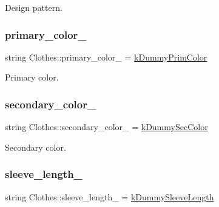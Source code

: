 Design pattern. 

\mbox{\label{classClothes_a7cb005bf6cbb7f4eaa40f1b31817559c}} 
\subsubsection{\texorpdfstring{primary\+\_\+color\+\_\+}{primary\_color\_}}
{\footnotesize\ttfamily string Clothes\+::primary\+\_\+color\+\_\+ = \mbox{\hyperlink{clothes_8h_a1b9c685d3bf2811d95b65e0d396c1344}{k\+Dummy\+Prim\+Color}}\hspace{0.3cm}{\ttfamily [protected]}}



Primary color. 

\mbox{\label{classClothes_ab8f55f67b956b25d71260cffcf273673}} 
\subsubsection{\texorpdfstring{secondary\+\_\+color\+\_\+}{secondary\_color\_}}
{\footnotesize\ttfamily string Clothes\+::secondary\+\_\+color\+\_\+ = \mbox{\hyperlink{clothes_8h_a71c39811135425d881af7760da63a73a}{k\+Dummy\+Sec\+Color}}\hspace{0.3cm}{\ttfamily [protected]}}



Secondary color. 

\mbox{\label{classClothes_a012aeb71e62ebaf9b5b5dd700cc8d5db}} 
\subsubsection{\texorpdfstring{sleeve\+\_\+length\+\_\+}{sleeve\_length\_}}
{\footnotesize\ttfamily string Clothes\+::sleeve\+\_\+length\+\_\+ = \mbox{\hyperlink{clothes_8h_a0f53dde6a2c4c344bb7da50655497350}{k\+Dummy\+Sleeve\+Length}}\hspace{0.3cm}{\ttfamily [protected]}}



